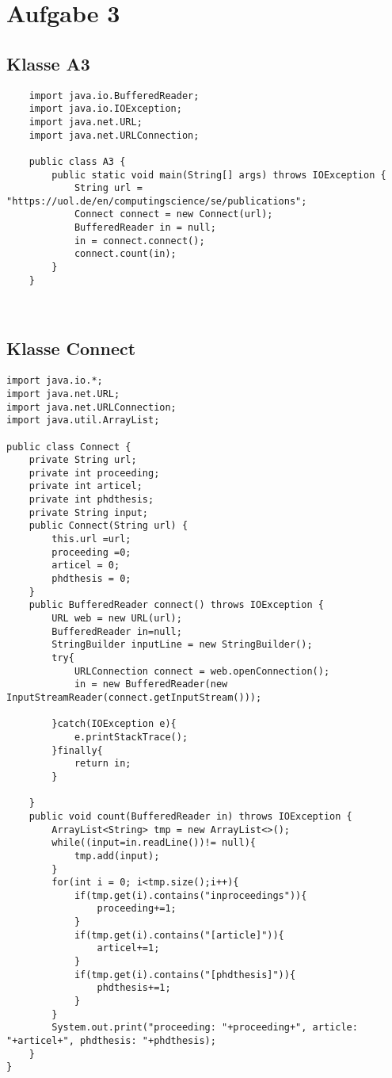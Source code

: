 \documentclass[12pt,a4paper,oneside,ngerman]{article}
\begin{document}
\section*{Aufgabe 3}
\subsection*{Klasse A3}
\begin{lstlisting}
	import java.io.BufferedReader;
	import java.io.IOException;
	import java.net.URL;
	import java.net.URLConnection;
	
	public class A3 {
		public static void main(String[] args) throws IOException {
			String url = "https://uol.de/en/computingscience/se/publications";
			Connect connect = new Connect(url);
			BufferedReader in = null;
			in = connect.connect();
			connect.count(in);
		}
	}
\end{lstlisting}
\\ 
\subsection*{Klasse Connect}
\begin{lstlisting}
import java.io.*;
import java.net.URL;
import java.net.URLConnection;
import java.util.ArrayList;

public class Connect {
    private String url;
    private int proceeding;
    private int articel;
    private int phdthesis;
    private String input;
    public Connect(String url) {
        this.url =url;
        proceeding =0;
        articel = 0;
        phdthesis = 0;
    }
    public BufferedReader connect() throws IOException {
        URL web = new URL(url);
        BufferedReader in=null;
        StringBuilder inputLine = new StringBuilder();
        try{
            URLConnection connect = web.openConnection();
            in = new BufferedReader(new InputStreamReader(connect.getInputStream()));

        }catch(IOException e){
            e.printStackTrace();
        }finally{
            return in;
        }

    }
    public void count(BufferedReader in) throws IOException {
        ArrayList<String> tmp = new ArrayList<>();
        while((input=in.readLine())!= null){
            tmp.add(input);
        }
        for(int i = 0; i<tmp.size();i++){
            if(tmp.get(i).contains("inproceedings")){
                proceeding+=1;
            }
            if(tmp.get(i).contains("[article]")){
                articel+=1;
            }
            if(tmp.get(i).contains("[phdthesis]")){
                phdthesis+=1;
            }
        }
        System.out.print("proceeding: "+proceeding+", article: "+articel+", phdthesis: "+phdthesis);
    }
}

\end{lstlisting}
\end{document}
